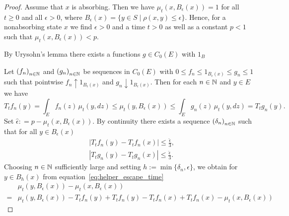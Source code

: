 \documentclass[../Master.tex]{subfiles}
\begin{document}
\begin{proof}
  Assume that \(x\) is absorbing. Then we have \(\mu_t (x, B_\epsilon(x)) = 1\) for all \(t \ge 0\) and all \(\epsilon > 0\), where \(B_\epsilon (x) = \{y \in S \mid \rho(x,y) \le \epsilon{}\}{}\). Hence, for a nonabsorbing state \(x\) we find \(\epsilon > 0\) and a time \(t > 0\) as well as a constant \(p < 1\) such that \(\mu_t (x, B_\epsilon(x)) < p\).
  
  By Urysohn's lemma there exists a functions \(g \in C_0(E)\) with \(1_B_{}\)





  Let \({(f_n)}_{n \in \mathbb{N}}\) and \({(g_n)}_{n \in \mathbb{N}}\) be sequences in \(C_0(E)\) with \(0 \le f_n \le 1_{B_\epsilon(x)} \le g_n \le 1\) such that pointwise \(f_n \uparrow 1_{B_\epsilon(x)}\) and \(g_n \downarrow 1_{B_\epsilon(x)}\). Then for each \(n \in \mathbb{N}{}\) and \(y \in E\) we have
  \begin{equation}\label{eq:helper_escape_time}
    T_t f_n (y) = \int_E f_n(z) \, \mu_t(y, dz) \le \mu_t(y, B_\epsilon(x)) \le \int_E g_n(z) \, \mu_t(y, dz) = T_t g_n (y).
  \end{equation}
  Set \(\hat{\epsilon} : = p - \mu_t(x, B_\epsilon(x))\). By continuity there exists a sequence \({(\delta_n)}_{n \in \mathbb{N}}\) such that for all \(y \in B_\epsilon(x)\)
  \begin{equation*}
    \begin{aligned}
      &\left\lvert T_t f_n (y) - T_t f_n (x) \right\rvert \le \frac{\hat{\epsilon}}{3}, \\
      &\left\lvert T_t g_n (y) - T_t g_n (x) \right\rvert \le \frac{\hat{\epsilon}}{3}.
    \end{aligned}
  \end{equation*}
  Choosing \(n \in \mathbb{N}{}\) sufficiently large and setting \(h := \min \{\delta_n, \epsilon{}\}{}\), we obtain for \(y \in B_h(x)\) from equation~\eqref{eq:helper_escape_time}
  \begin{equation}
    \begin{aligned}
      & \mu_t(y, B_\epsilon(x)) - \mu_t(x, B_\epsilon(x)) \\
      = & \mu_t(y, B_\epsilon(x)) - T_t f_n (y) + T_t f_n (y) - T_t f_n(x) + T_t f_n (x) - \mu_t(x, B_\epsilon(x))
    \end{aligned}
  \end{equation}

  
  

\end{proof}
\end{document}
